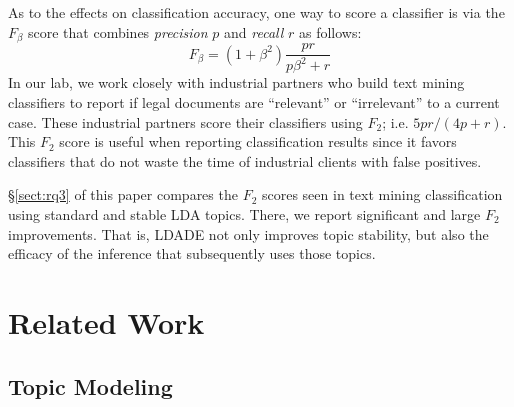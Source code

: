 \documentclass[twocolumn,5p,sort&compress]{elsarticle}
\newcommand{\tion}[1]{{\S}\ref{sect:#1}}
\theoremstyle{break}
\begin{document}
As to the effects on classification accuracy, 
one way to score a classifier is via the $F_\beta$ score that combines
{\em precision} $p$ and {\em recall} $r$ as follows:
\begin{equation}\label{eq:f}
F_{\beta} = (1+\beta^2) \frac{pr}{p\beta^2 + r}
\end{equation}
In our lab, we work closely with industrial partners who build
text mining
 classifiers to report if legal documents are
``relevant'' or ``irrelevant'' to a current case.
These industrial partners score their classifiers using   $F_2$; i.e.
\mbox{$5pr/(4p + r)$}. This $F_2$ score is useful when reporting classification results
since it favors classifiers that do not waste the time of industrial clients with false positives.

\tion{rq3} of this paper compares the $F_2$ scores seen in text mining classification using standard and stable LDA topics.
There, we report 
significant and large
$F_2$ improvements. That is, LDADE not only improves topic stability, but also the efficacy
of the inference that subsequently uses those topics.
\section{Related Work}
\label{sect:related}

\subsection{Topic Modeling}\label{sect:tm}
\end{document}
